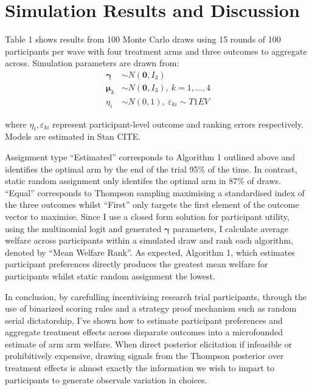 \documentclass[twoside,11pt]{article}
\begin{document}
 
\section*{Simulation Results and Discussion}


Table 1 shows results from 100 Monte Carlo draws using 15 rounds of 100 
participants per wave with four treatment arms and three outcomes to 
aggregate across. Simulation parameters are drawn from:
\begin{align*}
  \bm{\gamma} &\sim N(\bm{0}, I_3) \\
  \bm{\mu}_k &\sim N(\bm{0}, I_3), \ k = 1, ..., 4 \\
  \eta_i &\sim N(0, 1),\ \varepsilon_{ki} \sim T1EV
\end{align*}

where $\eta_i, \varepsilon_{ki}$ represent participant-level outcome and 
ranking errors respectively. Models are estimated in Stan CITE.

Assignment type ``Estimated'' corresponds to Algorithm 1 outlined above and 
identifies the optimal arm by the end of the trial 95\% of the time. In contrast, 
static random assignment only identifes the optimal arm in 87\% of draws. ``Equal''
corresponds to Thompson sampling maximising a standardised index of the three 
outcomes whilst ``First'' only targets the first element of the outcome vector to 
maximise. Since I use a closed form solution for participant utility, using the 
multinomial logit and generated $\bm{\gamma}$ parameters, I calculate average 
welfare across participants within a simulated draw and rank each algorithm, 
denoted by ``Mean Welfare Rank''. As expected, Algorithm 1, which estimates 
participant preferences directly produces the greatest mean welfare for participants 
whilst static random assignment the lowest.

In conclusion, by carefulling incentivising research trial participants, through the 
use of binarized scoring rules and a strategy proof mechanism such as 
random serial dictatorship, I've shown how to estimate participant preferences
and aggregate treatment effects across disparate outcomes into a microfounded 
estimate of arm arm welfare. When direct posterior elicitation if infeasible or 
prohibitively expensive, drawing signals from the Thompson posterior over treatment 
effects is almost exactly the information we wish to impart to participants 
to generate observale variation in choices.



\newpage


\vskip 0.2in

\end{document}
